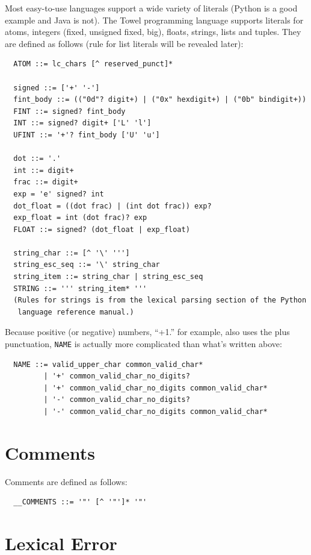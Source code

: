 \documentclass{report}
\begin{document}
Most easy-to-use languages support a wide variety of literals (Python is a good example and Java is not). The Towel programming language supports literals for atoms, integers (fixed, unsigned fixed, big), floats, strings, lists and tuples. They are defined as follows (rule for list literals will be revealed later):
\begin{verbatim}
  ATOM ::= lc_chars [^ reserved_punct]*

  signed ::= ['+' '-']
  fint_body ::= (("0d"? digit+) | ("0x" hexdigit+) | ("0b" bindigit+))
  FINT ::= signed? fint_body
  INT ::= signed? digit+ ['L' 'l']
  UFINT ::= '+'? fint_body ['U' 'u']

  dot ::= '.'
  int ::= digit+
  frac ::= digit+
  exp = 'e' signed? int
  dot_float = ((dot frac) | (int dot frac)) exp?
  exp_float = int (dot frac)? exp
  FLOAT ::= signed? (dot_float | exp_float)

  string_char ::= [^ '\' ''']
  string_esc_seq ::= '\' string_char
  string_item ::= string_char | string_esc_seq
  STRING ::= ''' string_item* '''
  (Rules for strings is from the lexical parsing section of the Python
   language reference manual.)
\end{verbatim}

\begin{mdframed}[style=detail]
Because positive (or negative) numbers, ``+1.'' for example, also uses the plus punctuation, \texttt{NAME} is actually more complicated than what's written above:
\begin{verbatim}
  NAME ::= valid_upper_char common_valid_char*
         | '+' common_valid_char_no_digits?
         | '+' common_valid_char_no_digits common_valid_char*
         | '-' common_valid_char_no_digits?
         | '-' common_valid_char_no_digits common_valid_char*
\end{verbatim}
\end{mdframed}

\section{Comments}

Comments are defined as follows:
\begin{verbatim}
  __COMMENTS ::= '"' [^ '"']* '"'
\end{verbatim}

\section{Lexical Error}
\end{document}
